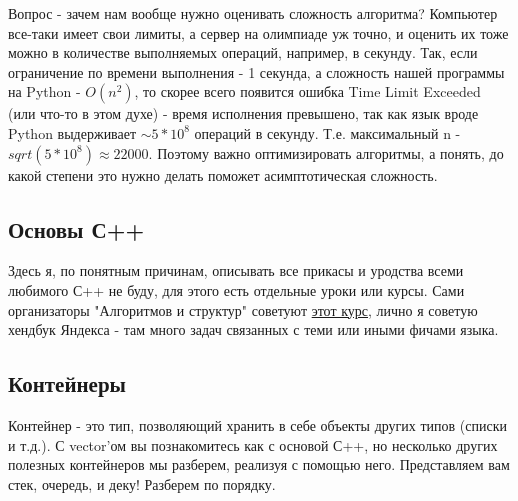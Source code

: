 \documentclass[a4paper,12pt]{article}
\begin{document}
Вопрос - зачем нам вообще нужно оценивать сложность алгоритма? Компьютер все-таки имеет
свои лимиты, а сервер на олимпиаде уж точно, и оценить их тоже можно в количестве выполняемых
операций, например, в секунду. Так, если ограничение по времени выполнения - 1 секунда,
а сложность нашей программы на Python - $O(n^2)$, то скорее всего появится ошибка Time Limit Exceeded
(или что-то в этом духе) - время исполнения превышено, так как язык вроде Python выдерживает
$\sim5*10^8$ операций в секунду. Т.е. максимальный n - $sqrt(5*10^8)\approx22000$. Поэтому важно
оптимизировать алгоритмы, а понять, до какой степени это нужно делать поможет асимптотическая
сложность.

\subsection{Основы С++}
Здесь я, по понятным причинам, описывать все прикасы и уродства всеми любимого
С++ не буду, для этого есть отдельные уроки или курсы. Сами организаторы "Алгоритмов и
структур" советуют \href{https://stepik.org/course/363/syllabus}{этот курс}, лично
я советую хендбук Яндекса - там много задач связанных
с теми или иными фичами языка.

\subsection{Контейнеры}
Контейнер - это тип, позволяющий хранить в себе объекты других типов (списки и т.д.).
С vector'ом вы познакомитесь как с основой С++, но несколько других полезных контейнеров
мы разберем, реализуя с помощью него. Представляем вам стек, очередь, и деку! Разберем
по порядку.
\end{document}
